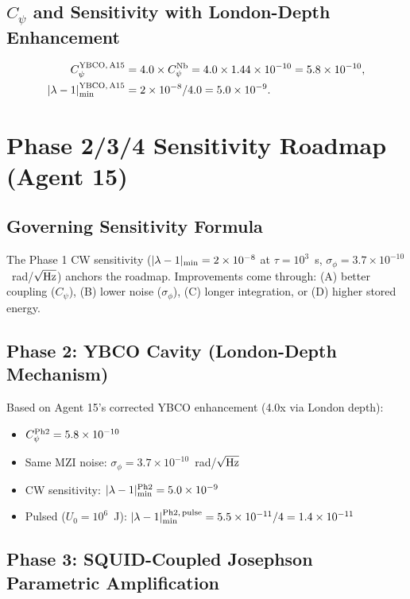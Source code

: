 \documentclass[11pt]{article}
\newcommand{\ee}[1]{\times 10^{#1}}
\begin{document}
\subsection{$C_\psi$ and Sensitivity with London-Depth Enhancement}

\begin{align}
C_\psi^{\rm YBCO,\,A15} &= 4.0 \times C_\psi^{\rm Nb} = 4.0 \times 1.44\ee{-10} = 5.8\ee{-10}, \\
|\lambda-1|_{\rm min}^{\rm YBCO,\,A15} &= 2\ee{-8} / 4.0 = 5.0\ee{-9}.
\end{align}

\section{Phase 2/3/4 Sensitivity Roadmap (Agent 15)}
\label{sec:a15-roadmap}

\subsection{Governing Sensitivity Formula}

The Phase 1 CW sensitivity ($|\lambda-1|_{\rm min} = 2\ee{-8}$ at $\tau = 10^3$~s,
$\sigma_\phi = 3.7\ee{-10}$~rad/$\sqrt{\rm Hz}$) anchors the roadmap.
Improvements come through:
(A) better coupling ($C_\psi$), (B) lower noise ($\sigma_\phi$), (C) longer
integration, or (D) higher stored energy.

\subsection{Phase 2: YBCO Cavity (London-Depth Mechanism)}

Based on Agent 15's corrected YBCO enhancement (4.0x via London depth):
\begin{itemize}
\item $C_\psi^{\rm Ph2} = 5.8\ee{-10}$
\item Same MZI noise: $\sigma_\phi = 3.7\ee{-10}$~rad/$\sqrt{\rm Hz}$
\item CW sensitivity: $|\lambda-1|_{\rm min}^{\rm Ph2} = 5.0\ee{-9}$
\item Pulsed ($U_0 = 10^6$~J): $|\lambda-1|_{\rm min}^{\rm Ph2,\,pulse} = 5.5\ee{-11}/4 = 1.4\ee{-11}$
\end{itemize}

\subsection{Phase 3: SQUID-Coupled Josephson Parametric Amplification}
\end{document}

